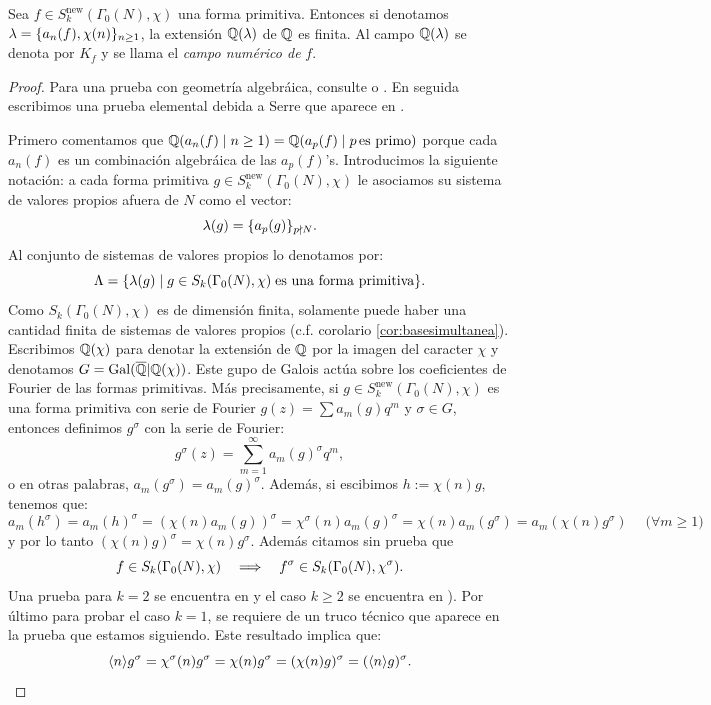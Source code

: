 \begin{prop}\label{prop:camponumerico}
  Sea $f\in S_k^{\mathrm{new}}(\Gamma_0(N),\chi)$ una forma primitiva. Entonces si denotamos
  $\lambda=\{a_n(f),\chi(n)\}_{n\geq1}$, la extensi\'on $\mathbb{Q}(\lambda)$ de $\mathbb{Q}$ es finita. Al campo
  $\mathbb{Q}(\lambda)$ se denota por $K_f$ y se llama el \emph{campo num\'erico de} $f$.
\end{prop}
\begin{proof}%
  Para una prueba con geometr\'ia algebr\'aica, consulte
  \cite[proposici\'on 2.7.3 de \S2]{DeligneSerreFMDP1} o \cite[\S6.5]{DiamondShurmanAFCIMF}.
  En seguida escribimos una prueba elemental debida a Serre que aparece en \cite[\S2.5]{SerreMFOW1AGR}.

  Primero comentamos que $\mathbb{Q}(a_n(f)\mid n\geq1)=\mathbb{Q}(a_p(f)\mid p\,\text{es primo})$ porque cada $a_n(f)$ es un
  combinaci\'on algebr\'aica de las $a_p(f)$'s. Introducimos la
  siguiente notaci\'on: a cada forma primitiva $g\in S_k^{\mathrm{new}}(\Gamma_0(N),\chi)$ le
  asociamos su sistema de valores propios afuera de $N$ como el vector:
  \[
    \lambda(g)=\{a_p(g)\}_{p\nmid N}.
  \]
  Al conjunto de sistemas de valores propios lo denotamos por:
  \[
    \Lambda=\{\lambda(g)\mid g\in S_k(\Gamma_0(N),\chi)\;\text{es una forma primitiva}\}.
  \]
  Como $S_k(\Gamma_0(N),\chi)$ es de dimensi\'on finita, solamente puede haber una cantidad finita de
  sistemas de valores propios (c.f. corolario \ref{cor:basesimultanea}).
  Escribimos $\mathbb{Q}(\chi)$ para denotar la extensi\'on de $\mathbb{Q}$ por la imagen del caracter $\chi$ y
  denotamos $G=\mathrm{Gal}(\overline{\mathbb{Q}}|\mathbb{Q}(\chi))$. Este gupo de Galois act\'ua sobre los coeficientes de Fourier
  de las formas primitivas. M\'as precisamente, si $g\in S_k^{\mathrm{new}}(\Gamma_0(N),\chi)$ es una forma primitiva 
  con serie de Fourier $g(z)=\sum a_m(g)q^m$ y $\sigma\in G$, entonces definimos $g^{\sigma}$ con la
  serie de Fourier:
  \[
    g^{\sigma}(z)=\sum_{m=1}^{\infty}a_m(g)^{\sigma}q^m,
  \]
  o en otras palabras, $a_m(g^{\sigma})=a_m(g)^{\sigma}$. Adem\'as, si escibimos $h:=\chi(n)g$, tenemos
  que:
  \[
    a_m(h^{\sigma})=a_m(h)^{\sigma}=(\chi(n)a_m(g))^{\sigma}=\chi^{\sigma}(n)a_m(g)^{\sigma}
                     =\chi(n)a_m(g^{\sigma})=a_m(\chi(n)g^{\sigma})\quad\;\big(\forall m\geq1\big)
  \]
  y por lo tanto $(\chi(n)g)^{\sigma}=\chi(n)g^{\sigma}$. Adem\'as citamos sin prueba que
  \[
    f\in S_k(\Gamma_0(N),\chi) \quad\Longrightarrow\quad f^{\sigma}\in S_k(\Gamma_0(N),\chi^{\sigma}).
  \]
  Una prueba para $k=2$ se encuentra en \cite[teorema 6.5.4]{DiamondShurmanAFCIMF} y el caso $k\geq2$ se
  encuentra en \cite[\S 3.5]{ShimuraITTATOAF}). Por \'ultimo para probar el caso $k=1$, se requiere de un truco
  t\'ecnico que aparece en la prueba que estamos siguiendo. Este resultado implica que:
  \begin{equation}\label{eq:diamsigma}
    \langle n \rangle g^{\sigma}=\chi^{\sigma}(n)g^{\sigma}=\chi(n)g^{\sigma}=(\chi(n)g)^{\sigma}=(\langle n \rangle g)^{\sigma}.
  \end{equation}
  


\end{proof}

